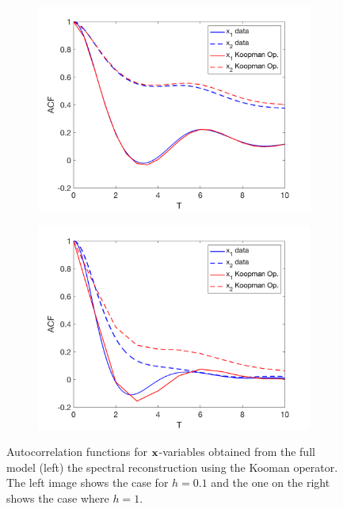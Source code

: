 \documentclass[12pt]{article}
\begin{document}
\begin{figure}[H]
	\centering
	\begin{subfigure}[b]{0.49\textwidth}
		\centering
		\includegraphics[width=\textwidth]{plots/climate_model/h1/corr_top_e1.png}
	\end{subfigure}
	\begin{subfigure}[b]{0.49\textwidth}
		\centering
		\includegraphics[width=\textwidth]{plots/climate_model/h01/corr_top_e01.png}
	\end{subfigure}
	\caption{\label{autocorrelations transfer operator}Autocorrelation functions for $\mathbf{x}$-variables obtained from the full model (left) the spectral reconstruction using the Kooman operator. The left image shows the case for $h=0.1$ and the one on the right shows the case where $h=1$.}
\end{figure}
\end{document}
